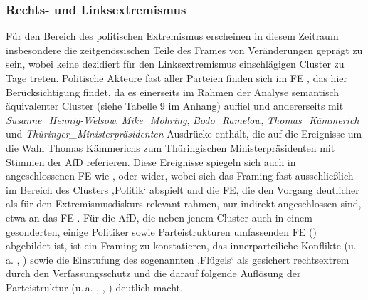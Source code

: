 \subsubsection{Rechts- und Linksextremismus}\label{rechts--und-linksextremismus-7}

\largerpage
Für den Bereich des politischen Extremismus erscheinen in diesem Zeitraum insbesondere die zeitgenössischen Teile des Frames von Veränderungen geprägt zu sein, wobei keine dezidiert für den Linksextremismus einschlägigen Cluster zu Tage treten. Politische Akteure fast aller Parteien finden sich im FE , das hier Berücksichtigung findet, da es einerseits im Rahmen der Analyse semantisch äquivalenter Cluster (siehe Tabelle 9 im Anhang) auffiel und andererseits mit \emph{Susanne\_Hennig-Welsow}, \emph{Mike\_Mohring}, \emph{Bodo\_Ramelow}, \emph{Thomas\_Kämmerich} und \emph{Thüringer\_Ministerpräsidenten} Ausdrücke enthält, die auf die Ereignisse um die Wahl Thomas Kämmerichs zum Thüringischen Ministerpräsidenten mit Stimmen der AfD referieren. Diese Ereignisse spiegeln sich auch in angeschlossenen FE wie ,  oder  wider, wobei sich das Framing fast ausschließlich im Bereich des Clusters ‚Politik` abspielt und die FE, die den Vorgang deutlicher als für den Extremismusdiskurs relevant rahmen, nur indirekt angeschlossen sind, etwa an das FE . Für die AfD, die neben jenem Cluster auch in einem gesonderten, einige Politiker sowie Parteistrukturen umfassenden FE () abgebildet ist, ist ein Framing zu konstatieren, das innerparteiliche Konflikte (u.\,a. ,  ) sowie die Einstufung des sogenannten ‚Flügels` als gesichert rechtsextrem durch den Verfassungsschutz und die darauf folgende Auflösung der Parteistruktur (u.\,a. , , ) deutlich macht.

